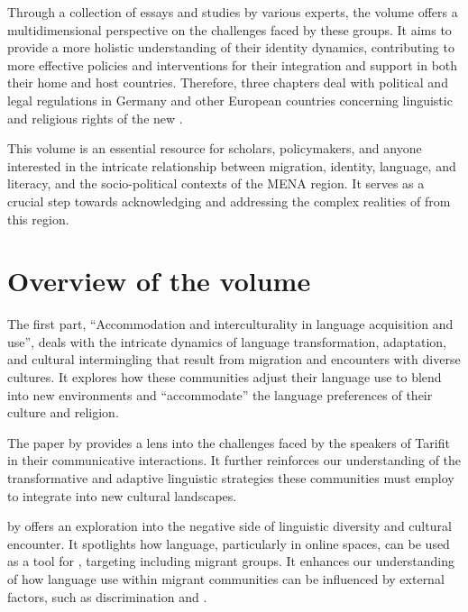 \documentclass[output=paper,colorlinks,citecolor=brown]{langscibook}
\begin{document}
Through a collection of essays and studies by various experts, the volume offers a multidimensional perspective on the challenges faced by these  groups. It aims to provide a more holistic understanding of their identity dynamics, contributing to more effective policies and interventions for their integration and support in both their home and host countries. Therefore, three chapters deal with political and legal regulations in Germany and other European countries concerning linguistic and religious rights of the new .

This volume is an essential resource for scholars, policymakers, and anyone interested in the intricate relationship between migration, identity, language, and literacy, and the socio-political contexts of the MENA region. It serves as a crucial step towards acknowledging and addressing the complex realities of  from this region.

\section{Overview of the volume}

The first part, ``Accommodation and interculturality in language acquisition and use'', deals with the intricate dynamics of language transformation, adaptation, and cultural intermingling that result from migration and encounters with diverse cultures. It explores how these communities adjust their language use to blend into new environments and ``accommodate'' the language preferences of their culture and religion.

The paper  by \citeauthor*{chapters/1.1_IFLMD_Petrou}
provides a lens into the challenges faced by the speakers of Tarifit  in their communicative interactions. It further reinforces our understanding of the transformative and adaptive linguistic strategies these communities must employ to integrate into new cultural landscapes.

 by \citeauthor*{chapters/1.2_IFLMD_Topidi}
offers an exploration into the negative side of linguistic diversity and cultural encounter. It spotlights how language, particularly in online spaces, can be used as a tool for , targeting  including migrant groups. It enhances our understanding of how language use within migrant communities can be influenced by external factors, such as discrimination and .
\end{document}
